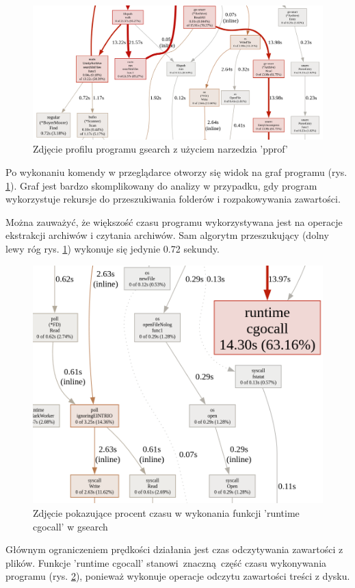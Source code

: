 \begin{figure}[htbp]
\centering
\includegraphics[width=1\textwidth]{./images/profiler1.png}
\caption{Zdjęcie profilu programu gsearch z użyciem narzedzia 'pprof'}
\label{fig:profilerGsearch1}
\end{figure}

Po wykonaniu komendy w przeglądarce otworzy się widok na graf programu (rys. \ref{fig:profilerGsearch1}).
Graf jest bardzo skomplikowany do analizy w przypadku, gdy program wykorzystuje rekursje do
przeszukiwania folderów i rozpakowywania zawartości.

Można zauważyć, że większość czasu programu wykorzystywana jest na operacje 
ekstrakcji archiwów i czytania archiwów. Sam algorytm przeszukujący (dolny lewy 
róg rys. \ref{fig:profilerGsearch1}) wykonuje się jedynie 0.72 sekundy.

\begin{figure}[htbp]
\centering
\includegraphics[width=1\textwidth]{./images/profiler2.png}
\caption{Zdjęcie pokazujące procent czasu w wykonania funkcji 'runtime cgocall' w gsearch}
\label{fig:profilerGsearch2}
\end{figure}

Głównym ograniczeniem prędkości działania jest czas odczytywania zawartości z plików.
Funkcje 'runtime cgocall' stanowi znaczną część czasu
wykonywania programu (rys. \ref{fig:profilerGsearch2}), ponieważ wykonuje operacje
odczytu zawartości treści z dysku.